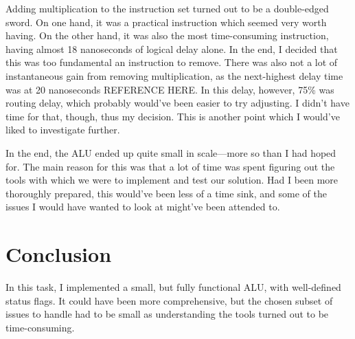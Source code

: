 \documentclass{article}
\begin{document}
Adding multiplication to the instruction set turned out to be a double-edged sword. On one hand, it was a practical instruction which seemed very worth having. On the other hand, it was also the most time-consuming instruction, having almost 18 nanoseconds of logical delay alone. In the end, I decided that this was too fundamental an instruction to remove. There was also not a lot of instantaneous gain from removing multiplication, as the next-highest delay time was at 20 nanoseconds REFERENCE HERE. In this delay, however, 75\% was routing delay, which probably would've been easier to try adjusting. I didn't have time for that, though, thus my decision. This is another point which I would've liked to investigate further. 

In the end, the ALU ended up quite small in scale---more so than I had hoped for. The main reason for this was that a lot of time was spent figuring out the tools with which we were to implement and test our solution. Had I been more thoroughly prepared, this would've been less of a time sink, and some of the issues I would have wanted to look at might've been attended to.

\section{Conclusion}
\label{sec:conclusion}
In this task, I implemented a small, but fully functional ALU, with well-defined status flags. It could have been more comprehensive, but the chosen subset of issues to handle had to be small as understanding the tools turned out to be time-consuming.
\end{document}
